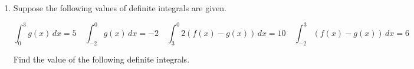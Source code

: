 \documentclass[11pt]{article}
\begin{document}
\begin{enumerate}
\begin{enumerate}[i]


    \item If $r(a)=5$, express $r(b)$ in terms of $r(a)$ and $\displaystyle \int_a^b r'(t)\,dt$.\\
    {\color{blue} $r(b) = r(a) + \displaystyle \int_a^b r'(t)\,dt$}
\end{enumerate}




\newpage


\item Suppose the following values of definite integrals are given.

\[
\int_{0}^{3} g(x)\,dx = 5
\quad
\int_{-2}^{0} g(x)\,dx = -2
\quad
\int_{3}^{0} 2(f(x) - g(x))\,dx = 10
\quad
\int_{-2}^{3} (f(x) - g(x))\,dx = 6
\]

Find the value of the following definite integrals.


\end{enumerate}
\end{document}
